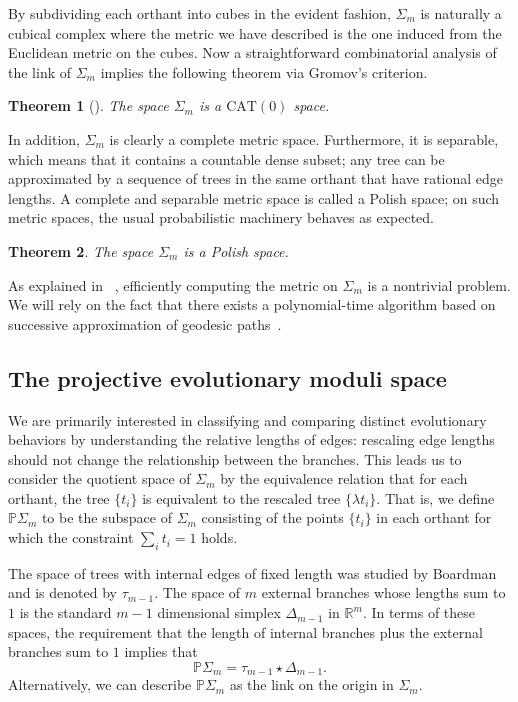 \documentclass[a4paper,11pt]{article}
\newtheorem{theorem}{Theorem}
\newcommand{\CAT}{\textrm{CAT}}
\begin{document}
By subdividing each orthant into cubes in the evident fashion, $\Sigma_m$ is naturally a cubical complex where the metric we have described is the one induced from the Euclidean metric on the cubes.
Now a straightforward combinatorial analysis of the link of $\Sigma_m$ implies the following theorem via Gromov's criterion.

\begin{theorem}[{\cite[4.1]{billera2001geometry}}]
The space $\Sigma_m$ is a $\CAT(0)$ space.
\end{theorem}

In addition, $\Sigma_m$ is clearly a complete metric space.
Furthermore, it is separable, which means that it contains a countable dense subset; any tree can be approximated by a sequence of trees in the same orthant that have rational edge lengths.
A complete and separable metric space is called a Polish space; on such metric spaces, the usual probabilistic machinery behaves as expected.

\begin{theorem}
The space $\Sigma_m$ is a Polish space.
\end{theorem}

As explained in ~\cite[\S4.2]{billera2001geometry}, efficiently computing the metric on $\Sigma_m$ is a nontrivial problem.
We will rely on the fact that there exists a polynomial-time algorithm based on successive approximation of geodesic paths~\cite{owen2011fast}.

\subsection{The projective evolutionary moduli space}

We are primarily interested in classifying and comparing distinct evolutionary behaviors by understanding the relative lengths of edges: rescaling edge lengths should not change the relationship between the branches.
This leads us to consider the quotient space of $\Sigma_m$ by the equivalence relation that for each orthant, the tree $\{t_i\}$ is equivalent to the rescaled tree $\{\lambda t_i\}$.
That is, we define $\mathbb{P} \Sigma_m$ to be the subspace of $\Sigma_m$ consisting of the points $\{t_i\}$ in each orthant for which the constraint $\sum_{i} t_i = 1$ holds.

The space of trees with internal edges of fixed length was studied by Boardman and is denoted by $\tau_{m-1}$.
The space of $m$ external branches whose lengths sum to $1$ is the standard $m-1$ dimensional simplex $\Delta_{m-1}$ in $\mathbb{R}^m$.
In terms of these spaces, the requirement that the length of internal branches plus the external branches sum to $1$ implies that
\[\mathbb{P}\Sigma_m = \tau_{m-1} \star \Delta_{m-1}.\] 
Alternatively, we can describe $\mathbb{P}\Sigma_m$ as the link on the origin in $\Sigma_m$.
\end{document}
